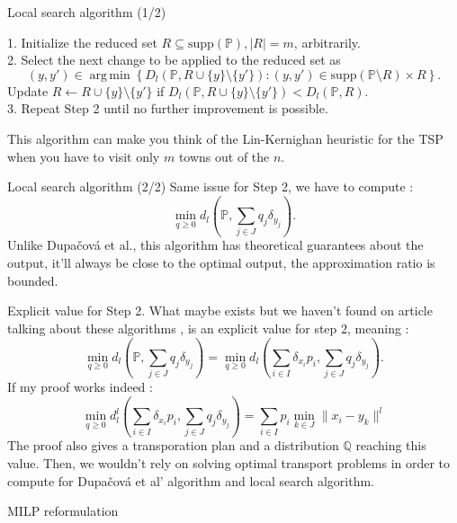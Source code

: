 \documentclass{beamer}
\DeclareMathOperator*{\argmin}{arg\,min}
\theoremstyle{plain}
\begin{document}
\begin{frame}{Local search algorithm (1/2)}
    \begin{algorithm}[H]
    \caption{Local search algorithm for $D_l\left(\mathbb{P},m\right)$}\label{Local search}
    1. Initialize the reduced set $R\subseteq \text{supp}\left(\mathbb{P}\right), \lvert R\rvert = m$, arbitrarily. \\ 2. Select the next change to be applied to the reduced set as 
    $$
    \left(y,y'\right)\in\argmin\left\{D_l\left(\mathbb{P},R\cup\{y\}\setminus \{y'\}\right) : \left(y,y'\right)\in\text{supp}\left(\mathbb{P}\setminus R\right)\times R\right\}.
    $$
    Update $R\gets R\cup \{y\}\setminus \{y'\}$ if $D_l\left(\mathbb{P}, R\cup\{y\}\setminus \{y'\} \right)<D_l\left(\mathbb{P},R\right).$ \\ 3. Repeat Step 2 until no further improvement is possible.
    \end{algorithm}
    This algorithm can make you think of the Lin-Kernighan heuristic for the TSP when you have to visit only $m$ towns out of the $n$.
\end{frame}

\begin{frame}{Local search algorithm (2/2)}
    Same issue for Step 2, we have to compute :
    $$
    \min_{q\geq 0}d_l\left(\mathbb{P}, \sum_{j\in J}q_j\delta_{y_j}\right).
    $$
    Unlike Dupačová et al., this algorithm has theoretical guarantees about the output, it'll always be close to the optimal output, the approximation ratio is bounded. 
\end{frame}

\begin{frame}{Explicit value for Step 2.}
    What maybe exists but we haven't found on article talking about these algorithms \cite{rujeerapaiboon_scenario_2022}, \cite{bertsimas_optimization-based_2023} is an explicit value for step 2, meaning : 
    $$
    \min_{q\geq 0}d_l\left(\mathbb{P}, \sum_{j\in J}q_j\delta_{y_j}\right)= \min_{q\geq 0}d_l\left(\sum_{i\in I}\delta_{x_i}p_i, \sum_{j\in J}q_j\delta_{y_j}\right).
    $$
    If my proof works indeed : 
$$
    \min_{q\geq 0}d_l^l\left(\sum_{i\in I}\delta_{x_i}p_i, \sum_{j\in J}q_j\delta_{y_j}\right)=\sum_{i\in I}p_i\min_{k\in J}\lVert x_i-y_k\rVert^l
$$
The proof also gives a transporation plan and a distribution $\mathbb{Q}$ reaching this value. Then, we wouldn't rely on solving optimal transport problems in order to compute for Dupačová et al' algorithm and local search algorithm.
\end{frame}

\begin{frame}{MILP reformulation}
    
\end{frame}


\end{document}
